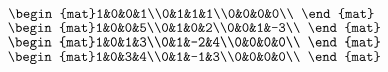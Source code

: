 \begin{Answer}
\Question $\begin{mat}1&0&0&1\\0&1&1&1\\0&0&0&0\\ \end{mat}$
\Question $\begin{mat}1&0&0&5\\0&1&0&2\\0&0&1&-3\\ \end{mat}$
\Question $\begin{mat}1&0&1&3\\0&1&-2&4\\0&0&0&0\\ \end{mat}$
\Question $\begin{mat}1&0&3&4\\0&1&-1&3\\0&0&0&0\\ \end{mat}$
\end{Answer}
